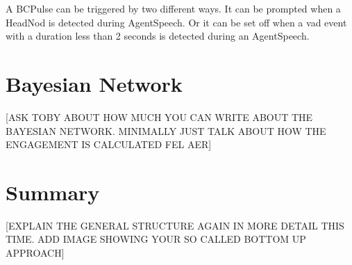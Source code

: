 \documentclass[12pt, a4paper, fleqn]{memoir}%
\begin{document}
A BCPulse can be triggered by two different ways. It can be prompted when a HeadNod is detected during AgentSpeech. Or it can be set off when a vad event with a duration less than 2 seconds is detected during an AgentSpeech.

\chapter{Bayesian Network}
\label{chap:BayesianNetwork}
[ASK TOBY ABOUT HOW MUCH YOU CAN WRITE ABOUT THE BAYESIAN NETWORK. MINIMALLY JUST TALK ABOUT HOW THE ENGAGEMENT IS CALCULATED FEL AER]

\chapter{Summary}
\label{Summary}
[EXPLAIN THE GENERAL STRUCTURE AGAIN IN MORE DETAIL THIS TIME. ADD IMAGE SHOWING YOUR SO CALLED BOTTOM UP APPROACH]

{\small}


\backmatter
\end{document}

